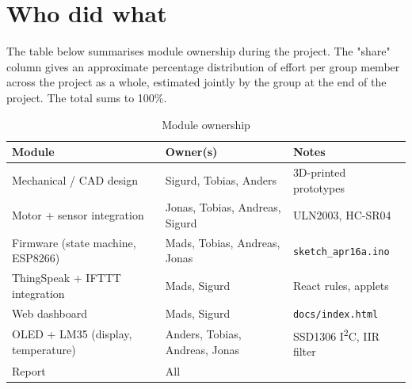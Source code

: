 \documentclass{article}
\begin{document}
\fi

\section{Who did what}
\label{sec:appendix-who}

The table below summarises module ownership during the project. The "share" column gives an approximate percentage distribution of effort per group member across the project as a whole, estimated jointly by the group at the end of the project. The total sums to 100\%.

\begin{table}[H]
    \centering
    \begin{tabular}{l|l|l}
        \textbf{Module} & \textbf{Owner(s)} & \textbf{Notes} \\
        \hline
        Mechanical / CAD design                  & Sigurd, Tobias, Anders              & 3D-printed prototypes \\
        
        Motor + sensor integration               & Jonas, Tobias, Andreas, Sigurd      & ULN2003, HC-SR04 \\
        Firmware (state machine, ESP8266)        & Mads, Tobias, Andreas, Jonas                        & \texttt{sketch\_apr16a.ino} \\
        ThingSpeak + IFTTT integration           & Mads, Sigurd                        & React rules, applets \\
        Web dashboard                            & Mads, Sigurd                      & \texttt{docs/index.html} \\
        OLED + LM35 (display, temperature)       & Anders, Tobias, Andreas, Jonas                      & SSD1306 I\textsuperscript{2}C, IIR filter \\
        Report                                   & All                         & \\
    \end{tabular}
    \caption{Module ownership}
    \label{tab:modulansvar}
\end{table}
\end{document}
